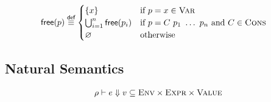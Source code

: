 \documentclass{article}
\def\rt{\Downarrow}
\def\envj#1#2#3{#1 \vdash #2 \rt #3}
\def\defeq{\overset{\textsf{def}}{\equiv}}
\begin{document}
\begin{align*}
\textsf{free}(p)& \defeq\begin{cases}
	\{x\} &\text{if $p=x\in \textsc{Var}$}\\
	\bigcup_{i=1}^n \textsf{free}(p_i) & \text{if $p=C \ p_1 \ \ldots \ p_n$ and $C\in \textsc{Cons}$}\\
	\varnothing & \text{otherwise}
\end{cases}
\end{align*}

\subsection*{Natural Semantics}

\begin{gather*}
\envj{\rho}{e}{v}\subseteq \textsc{Env}\times \textsc{Expr}\times \textsc{Value}
\end{gather*}
\end{document}
